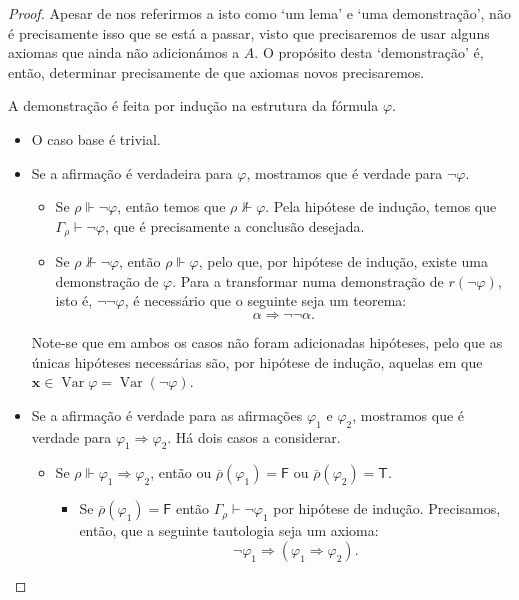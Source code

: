 \documentclass{report}
\theoremstyle{definition}
\theoremstyle{remark}
\renewcommand{\bf}[1]{\mathbf{#1}}
\newcommand{\lt}{\mathsf{T}}
\newcommand{\lf}{\mathsf{F}}
\DeclareMathOperator{\var}{Var}
\newcommand{\imply}{\mathbin{\Rightarrow}}
\begin{document}
	\begin{proof}
	Apesar de nos referirmos a isto como `um lema' e `uma demonstração', não é precisamente isso que se está a passar, visto que precisaremos de usar alguns axiomas que ainda não adicionámos a $A$. O propósito desta `demonstração' é, então, determinar precisamente de que axiomas novos precisaremos.
	
	A demonstração é feita por indução na estrutura da fórmula $\varphi$.
	
	\begin{itemize}
	\item O caso base é trivial.
	
	\item Se a afirmação é verdadeira para $\varphi$, mostramos que é verdade para $\neg \varphi$.
	
	\begin{itemize}
	\item Se $\rho \Vdash \neg \varphi$, então temos que $\rho \nVdash \varphi$. Pela hipótese de indução, temos que $\Gamma_\rho \vdash \neg \varphi$, que é precisamente a conclusão desejada.
	
	\item Se $\rho \nVdash \neg \varphi$, então $\rho \Vdash \varphi$, pelo que, por hipótese de indução, existe uma demonstração de $\varphi$. Para a transformar numa demonstração de $r(\neg \varphi)$, isto é, $\neg \neg \varphi$, é necessário que o seguinte seja um teorema:
	\[\alpha \imply \neg \neg \alpha.\]
	\end{itemize}
	
	Note-se que em ambos os casos não foram adicionadas hipóteses, pelo que as únicas hipóteses necessárias são, por hipótese de indução, aquelas em que $\bf x \in \var \varphi = \var(\neg \varphi)$.
	
	\item Se a afirmação é verdade para as afirmações $\varphi_1$ e $\varphi_2$, mostramos que é verdade para $\varphi_1 \imply \varphi_2$. Há dois casos a considerar.
	
	\begin{itemize}
	\item Se $\rho \Vdash \varphi_1 \imply \varphi_2$, então ou $\overline\rho(\varphi_1) = \lf$ ou $\overline\rho(\varphi_2) = \lt$.
	\begin{itemize}
	\item Se $\overline\rho(\varphi_1) = \lf$ então $\Gamma_\rho \vdash \neg \varphi_1$ por hipótese de indução. Precisamos, então, que a seguinte tautologia seja um axioma:
	\[\neg \varphi_1 \imply (\varphi_1 \imply \varphi_2).\]
	

\end{itemize}
\end{itemize}
\end{itemize}
\end{proof}
\end{document}
